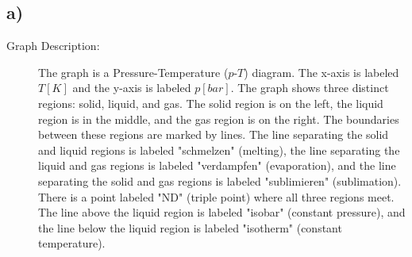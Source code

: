 

\subsection*{a)}

\begin{description}
    \item[Graph Description:] The graph is a Pressure-Temperature ($p$-$T$) diagram. The x-axis is labeled $T [K]$ and the y-axis is labeled $p [bar]$. The graph shows three distinct regions: solid, liquid, and gas. The solid region is on the left, the liquid region is in the middle, and the gas region is on the right. The boundaries between these regions are marked by lines. The line separating the solid and liquid regions is labeled "schmelzen" (melting), the line separating the liquid and gas regions is labeled "verdampfen" (evaporation), and the line separating the solid and gas regions is labeled "sublimieren" (sublimation). There is a point labeled "ND" (triple point) where all three regions meet. The line above the liquid region is labeled "isobar" (constant pressure), and the line below the liquid region is labeled "isotherm" (constant temperature).
\end{description}